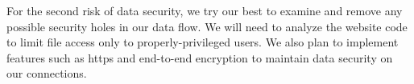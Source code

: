 For the second risk of data security, we try our best to examine and remove any possible security holes in our data flow.
We will need to analyze the website code to limit file access only to properly-privileged users. 
We also plan to implement features such as https and end-to-end encryption to maintain data security on our connections.

